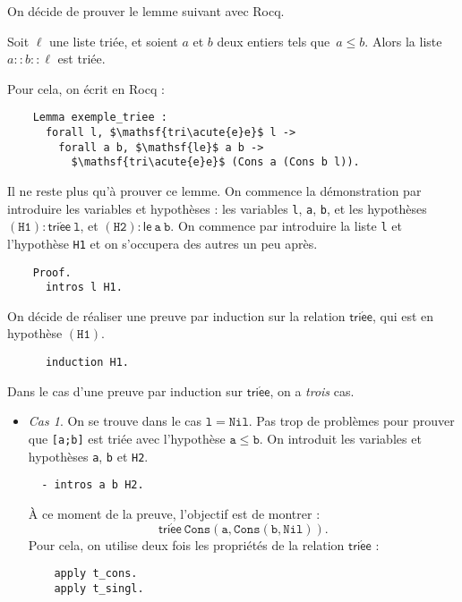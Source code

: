 \documentclass[../main]{subfiles}
\begin{document}
{  On décide de prouver le lemme suivant avec Rocq.

  \begin{not-lem}
    Soit $\ell$ une liste triée, et soient $a$ et $b$ deux entiers tels que~$a \le b$.
    Alors la liste $a :: b :: \ell$ est triée.
  \end{not-lem}

  Pour cela, on écrit en Rocq :
  \begin{lstlisting}
    Lemma exemple_triee :
      forall l, $\mathsf{tri\acute{e}e}$ l ->
        forall a b, $\mathsf{le}$ a b ->
          $\mathsf{tri\acute{e}e}$ (Cons a (Cons b l)).
  \end{lstlisting}

  Il ne reste plus qu'à prouver ce lemme.
  On commence la démonstration par introduire les variables et hypothèses : les variables \texttt{l}, \texttt{a}, \texttt{b}, et les hypothèses $(\mathtt{H1}) : \mathsf{tri\acute{e}e}\ \mathtt{l}$, et $(\mathtt{H2}) : \mathsf{le}\ \mathtt{a}\ \mathtt{b}$.
  On commence par introduire la liste \texttt{l} et l'hypothèse \texttt{H1} et on s'occupera des autres un peu après.
  \begin{lstlisting}
    Proof.
      intros l H1.
  \end{lstlisting}
  On décide de réaliser une preuve par induction sur la relation $\mathsf{tri\acute{e}e}$, qui est en hypothèse $(\mathtt{H1})$.
  \begin{lstlisting}
      induction H1.
  \end{lstlisting}
  Dans le cas d'une preuve par induction sur $\mathsf{tri\acute{e}e}$, on a \textit{trois} cas.
  \begin{itemize}
    \item \textsl{Cas 1}. On se trouve dans le cas $\mathtt{l} = \mathtt{Nil}$.
      Pas trop de problèmes pour prouver que  \texttt{[a;b]} est triée avec l'hypothèse $\mathtt{a} \le  \mathtt{b}$.
      On introduit les variables et hypothèses \texttt{a}, \texttt{b} et \texttt{H2}.
      \begin{lstlisting}
  - intros a b H2.
      \end{lstlisting}
      À ce moment de la preuve, l'objectif est de montrer :
      \[
      \mathsf{tri\acute{e}e}\ \mathtt{Cons}(\mathtt{a}, \mathtt{Cons}(\mathtt{b}, \mathtt{Nil}))
      .\]
      Pour cela, on utilise deux fois les propriétés de la relation $\mathsf{tri\acute{e}e}$ :
      \begin{lstlisting}
    apply t_cons.
    apply t_singl.
      \end{lstlisting}

\end{itemize}}
\end{document}
